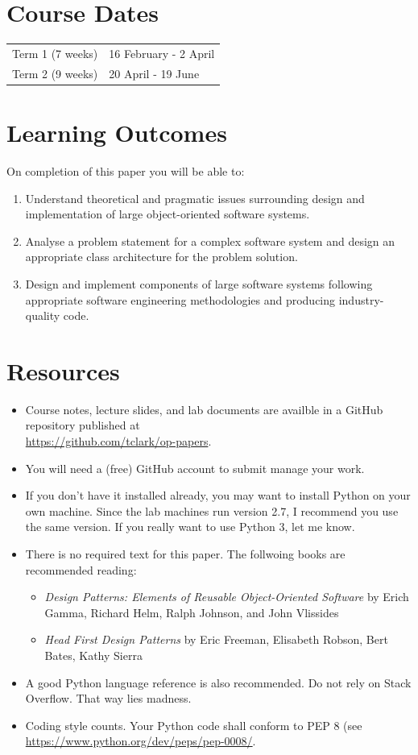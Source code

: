 \documentclass{article}
\begin{document}
\section*{Course Dates}
\begin{tabular}{ll}
Term 1 (7 weeks) & 16 February - 2 April\\
Term 2 (9 weeks) & 20 April - 19 June\\
\end{tabular}

\section*{Learning Outcomes}
On completion of this paper you will be able to:
\begin{enumerate}
    \item Understand theoretical and pragmatic issues surrounding design and implementation of large object-oriented software systems.
    \item Analyse a problem statement for a complex software system and design an appropriate class architecture for the problem solution.
    \item Design and implement components of large software systems following appropriate software engineering methodologies and producing industry-quality code.
\end{enumerate}

\section*{Resources}
\begin{itemize}
	\item Course notes, lecture slides, and lab documents are availble in a GitHub repository published at \\ \url{https://github.com/tclark/op-papers}.
	\item You will need a (free) GitHub account to submit manage your work.
	\item If you don't have it installed already, you may want to install Python on your own machine.  Since the lab machines run version 2.7, I recommend you use the same version.  If you really want to use Python 3, let me know.
	\item There is no required text for this paper.  The follwoing books are recommended reading:
		\begin{itemize}
			\item \emph{Design Patterns: Elements of Reusable Object-Oriented Software} by Erich Gamma, Richard Helm, Ralph Johnson, and John Vlissides
			\item \emph{Head First Design Patterns} by Eric Freeman, Elisabeth Robson, Bert Bates, Kathy Sierra
		\end{itemize}
	\item A good Python language reference is also recommended. Do not rely on Stack Overflow.  That way lies madness.
	\item Coding style counts.  Your Python code shall conform to PEP 8 (see
		\url{https://www.python.org/dev/peps/pep-0008/}.
\end{itemize}
\end{document}
